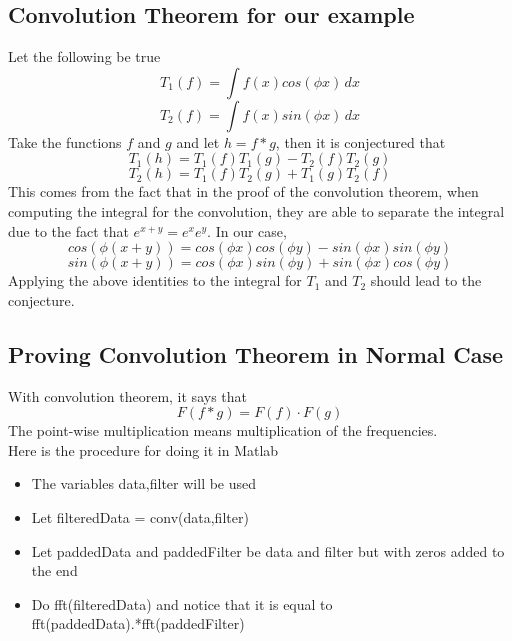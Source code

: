 \documentclass[11pt,psfig]{article}
\begin{document}
\setlength{\parskip}{1.2ex plus0.3ex minus 0.3ex}

\subsection*{Convolution Theorem for our example}

Let the following be true
\[
T_1(f) = \int{f(x) cos(\phi x) \,dx}
\]
\[
T_2(f) = \int{f(x) sin(\phi x) \,dx}
\]
Take the functions $f$ and $g$ and let $h = f*g$, then it is conjectured that
\[
T_1(h) = T_1(f) T_1(g) - T_2(f)T_2(g)
\]
\[
T_2(h) = T_1(f) T_2(g) + T_1(g)T_2(f)
\]
This comes from the fact that in the proof of the convolution theorem, when computing the integral for the convolution, they are able to separate the integral due to the fact that $e^{x+y} = e^x  e^y$. In our case,
\[
cos( \phi(x+y) ) = cos(\phi x)cos(\phi y) - sin(\phi x)sin(\phi y)
\]
\[
sin( \phi(x+y) ) = cos(\phi x)sin(\phi y) + sin(\phi x)cos(\phi y)
\]
Applying the above identities to the integral for $T_1$ and $T_2$ should lead to the conjecture. 
\\

\subsection*{Proving Convolution Theorem in Normal Case}
With convolution theorem, it says that
\[
F(f*g) = F(f) \cdot F(g)
\]
The point-wise multiplication means multiplication of the frequencies. \\

Here is the procedure for doing it in Matlab
\begin{itemize}
\item The variables data,filter will be used
\item Let filteredData = conv(data,filter)
\item Let paddedData and paddedFilter be data and filter but with zeros added to the end
\item Do fft(filteredData) and notice that it is equal to fft(paddedData).*fft(paddedFilter)
\end{itemize}
\end{document}
